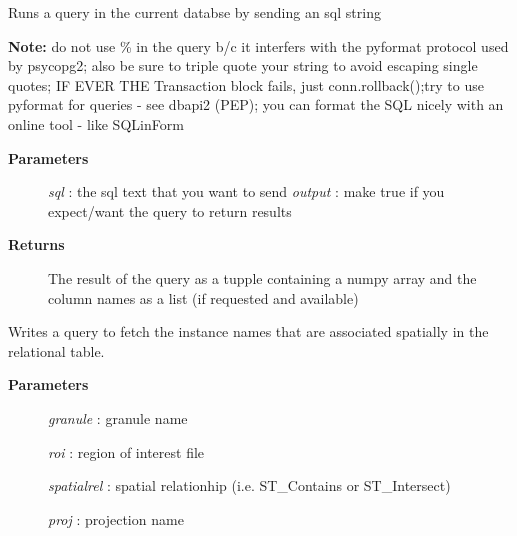 \documentclass[letterpaper,10pt,english]{sphinxmanual}
\begin{document}
\begin{fulllineitems}
\begin{fulllineitems}
\begin{description}
\end{description}

\end{fulllineitems}


\begin{fulllineitems}
\label{code:Database.Database.qryFromText}
Runs a query in the current databse by sending an sql string

\textbf{Note:} do not use \% in the query b/c it interfers with the pyformat protocol
used by psycopg2; also be sure to triple quote your string to avoid escaping single quotes;
IF EVER THE Transaction block fails, just conn.rollback();try to use pyformat for queries - see dbapi2 (PEP);
you can format the SQL nicely with an online tool - like SQLinForm
\begin{description}
\item[{\textbf{Parameters}}] \leavevmode
\emph{sql}  :   the sql text that you want to send
\emph{output} : make true if you expect/want the query to return results

\item[{\textbf{Returns}}] \leavevmode
The result of the query as a tupple containing a numpy array and the column names as a list (if requested and available)

\end{description}

\end{fulllineitems}


\begin{fulllineitems}
\label{code:Database.Database.qryGetInstances}
Writes a query to fetch the instance names that are
associated spatially in the relational table.
\begin{description}
\item[{\textbf{Parameters}}] \leavevmode
\emph{granule}   :   granule name

\emph{roi}   :   region of interest file

\emph{spatialrel}    :   spatial relationhip (i.e. ST\_Contains or ST\_Intersect)

\emph{proj}  :   projection name


\end{description}
\end{fulllineitems}
\end{fulllineitems}
\end{document}
